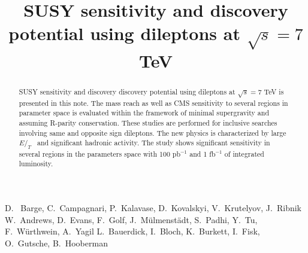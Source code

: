 \documentclass{cmspaper}
\newcommand{\met} {\ensuremath{E\!\!\!\!/_T}}
\begin{document}
%
\begin{titlepage}
\title{SUSY sensitivity and discovery potential using dileptons at $\sqrt{s} = 7 $ TeV}

  \begin{Authlist}
    D.~ Barge, C.~Campagnari, P.~Kalavase, D.~Kovalskyi, V.~Krutelyov, J.~Ribnik
    W.~Andrews, D.~Evans, F.~Golf, J.~M\"ulmenst\"adt, S.~Padhi, Y.~Tu, F.~W\"urthwein, A.~Yagil
    L.~Bauerdick, I.~Bloch, K.~Burkett, I.~Fisk, O.~Gutsche, B.~Hooberman
  \end{Authlist}

\begin{abstract}
SUSY sensitivity and discovery discovery potential using dileptons at $\sqrt{s} = 7 $ TeV
is presented in this note. The mass reach as well as CMS sensitivity to several regions in
parameter space is evaluated within the framework of minimal supergravity and assuming R-parity
conservation. These studies are performed for inclusive searches involving same and opposite 
sign dileptons. The new physics is characterized by large \met~ and significant hadronic 
activity. The study shows significant sensitivity in several regions in the parameters 
space with 100 pb$^{-1}$ and 1 fb$^{-1}$ of integrated luminosity.
\end{abstract}
\end{titlepage}









\clearpage

\end{document}
